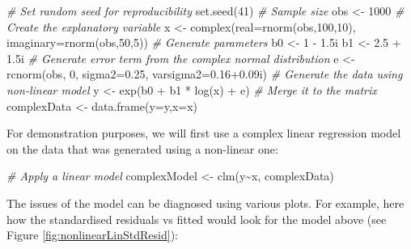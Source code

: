\documentclass[
]{book}
\newenvironment{Shaded}{\begin{snugshade}}{\end{snugshade}}
\newcommand{\AttributeTok}[1]{\textcolor[rgb]{0.77,0.63,0.00}{#1}}
\newcommand{\CommentTok}[1]{\textcolor[rgb]{0.56,0.35,0.01}{\textit{#1}}}
\newcommand{\DecValTok}[1]{\textcolor[rgb]{0.00,0.00,0.81}{#1}}
\newcommand{\FloatTok}[1]{\textcolor[rgb]{0.00,0.00,0.81}{#1}}
\newcommand{\FunctionTok}[1]{\textcolor[rgb]{0.00,0.00,0.00}{#1}}
\newcommand{\NormalTok}[1]{#1}
\newcommand{\OtherTok}[1]{\textcolor[rgb]{0.56,0.35,0.01}{#1}}
\newcommand{\SpecialCharTok}[1]{\textcolor[rgb]{0.00,0.00,0.00}{#1}}
\begin{document}
\begin{Shaded}
\begin{Highlighting}[]
\CommentTok{\# Set random seed for reproducibility}
\FunctionTok{set.seed}\NormalTok{(}\DecValTok{41}\NormalTok{)}
\CommentTok{\# Sample size}
\NormalTok{obs }\OtherTok{\textless{}{-}} \DecValTok{1000}
\CommentTok{\# Create the explanatory variable}
\NormalTok{x }\OtherTok{\textless{}{-}} \FunctionTok{complex}\NormalTok{(}\AttributeTok{real=}\FunctionTok{rnorm}\NormalTok{(obs,}\DecValTok{100}\NormalTok{,}\DecValTok{10}\NormalTok{), }\AttributeTok{imaginary=}\FunctionTok{rnorm}\NormalTok{(obs,}\DecValTok{50}\NormalTok{,}\DecValTok{5}\NormalTok{))}
\CommentTok{\# Generate parameters}
\NormalTok{b0 }\OtherTok{\textless{}{-}} \DecValTok{1} \SpecialCharTok{{-}} \FloatTok{1.5}\NormalTok{i}
\NormalTok{b1 }\OtherTok{\textless{}{-}} \FloatTok{2.5} \SpecialCharTok{+} \FloatTok{1.5}\NormalTok{i}
\CommentTok{\# Generate error term from the complex normal distribution}
\NormalTok{e }\OtherTok{\textless{}{-}} \FunctionTok{rcnorm}\NormalTok{(obs, }\DecValTok{0}\NormalTok{, }\AttributeTok{sigma2=}\FloatTok{0.25}\NormalTok{, }\AttributeTok{varsigma2=}\FloatTok{0.16+0.09}\NormalTok{i)}
\CommentTok{\# Generate the data using non{-}linear model}
\NormalTok{y }\OtherTok{\textless{}{-}} \FunctionTok{exp}\NormalTok{(b0 }\SpecialCharTok{+}\NormalTok{ b1 }\SpecialCharTok{*} \FunctionTok{log}\NormalTok{(x) }\SpecialCharTok{+}\NormalTok{ e)}
\CommentTok{\# Merge it to the matrix}
\NormalTok{complexData }\OtherTok{\textless{}{-}} \FunctionTok{data.frame}\NormalTok{(}\AttributeTok{y=}\NormalTok{y,}\AttributeTok{x=}\NormalTok{x)}
\end{Highlighting}
\end{Shaded}

For demonstration purposes, we will first use a complex linear regression model on the data that was generated using a non-linear one:

\begin{Shaded}
\begin{Highlighting}[]
\CommentTok{\# Apply a linear model}
\NormalTok{complexModel }\OtherTok{\textless{}{-}} \FunctionTok{clm}\NormalTok{(y}\SpecialCharTok{\textasciitilde{}}\NormalTok{x, complexData)}
\end{Highlighting}
\end{Shaded}

The issues of the model can be diagnosed using various plots. For example, here how the standardised residuals vs fitted would look for the model above (see Figure \ref{fig:nonlinearLinStdResid}):
\end{document}

